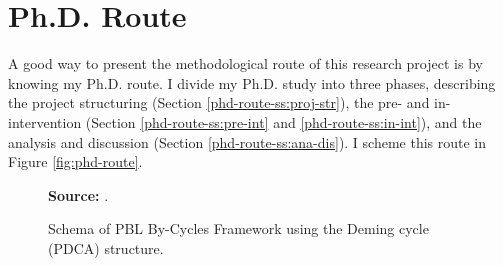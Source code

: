 \section{Ph.D. Route}
\label{res-des-sec:phd-route}

A good way to present the methodological route of this research project is by knowing my Ph.D. route. I divide my Ph.D. study into three phases, describing the project structuring (Section \ref{phd-route-ss:proj-str}), the pre- and in-intervention (Section \ref{phd-route-ss:pre-int} and \ref{phd-route-ss:in-int}), and the analysis and discussion (Section \ref{phd-route-ss:ana-dis}). I scheme this route in Figure \ref{fig:phd-route}.

\begin{figure}[ht!]
\centering

\caption{\textmd{Schema of \acrshort{PBL} By-Cycles Framework using the Deming cycle (\acrshort{PDCA}) structure.}}
\label{fig:pbl-by-cycles}

\par\medskip\ABNTEXfontereduzida\selectfont\textbf{Source:} .
\end{figure}

